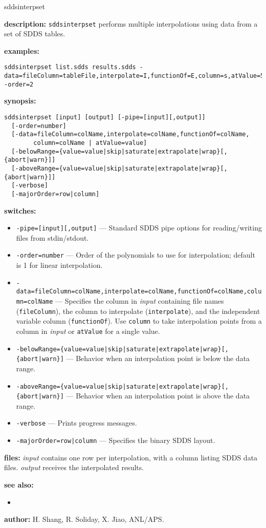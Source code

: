 \begin{sddsprog}{sddsinterpset}
  \item \textbf{description:}
    \verb|sddsinterpset| performs multiple interpolations using data from a set of SDDS tables.
  \item \textbf{examples:}
    \begin{verbatim}
sddsinterpset list.sdds results.sdds -data=fileColumn=tableFile,interpolate=I,functionOf=E,column=s,atValue=5 -order=2
    \end{verbatim}
  \item \textbf{synopsis:}
    \begin{verbatim}
sddsinterpset [input] [output] [-pipe=[input][,output]]
  [-order=number]
  [-data=fileColumn=colName,interpolate=colName,functionOf=colName,
        column=colName | atValue=value]
  [-belowRange={value=value|skip|saturate|extrapolate|wrap}[,{abort|warn}]]
  [-aboveRange={value=value|skip|saturate|extrapolate|wrap}[,{abort|warn}]]
  [-verbose]
  [-majorOrder=row|column]
    \end{verbatim}
  \item \textbf{switches:}
    \begin{itemize}
      \item \verb|-pipe=[input][,output]| --- Standard SDDS pipe options for reading/writing files from stdin/stdout.
      \item \verb|-order=number| --- Order of the polynomials to use for interpolation; default is 1 for linear interpolation.
      \item \verb|-data=fileColumn=colName,interpolate=colName,functionOf=colName,column=colName| --- Specifies the column in \emph{input} containing file names (\verb|fileColumn|), the column to interpolate (\verb|interpolate|), and the independent variable column (\verb|functionOf|). Use \verb|column| to take interpolation points from a column in \emph{input} or \verb|atValue| for a single value.
      \item \verb!-belowRange={value=value|skip|saturate|extrapolate|wrap}[,{abort|warn}]! --- Behavior when an interpolation point is below the data range.
      \item \verb!-aboveRange={value=value|skip|saturate|extrapolate|wrap}[,{abort|warn}]! --- Behavior when an interpolation point is above the data range.
      \item \verb|-verbose| --- Prints progress messages.
      \item \verb!-majorOrder=row|column! --- Specifies the binary SDDS layout.
    \end{itemize}
  \item \textbf{files:}
    \emph{input} contains one row per interpolation, with a column listing SDDS data files. \emph{output} receives the interpolated results.
  \item \textbf{see also:}
    \begin{itemize}
      \item {}
    \end{itemize}
  \item \textbf{author:} H. Shang, R. Soliday, X. Jiao, ANL/APS.
\end{sddsprog}
